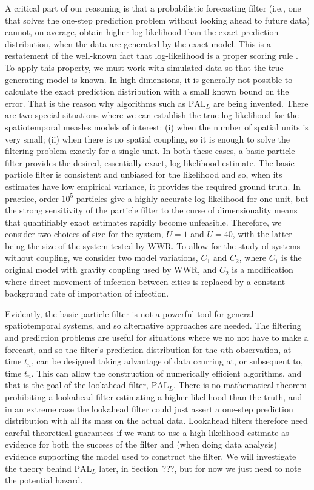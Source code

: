 \documentclass{article}
\newcommand\PALL{$\mathrm{PAL}_L$} %
\begin{document}
A critical part of our reasoning is that a probabilistic forecasting filter (i.e., one that solves the one-step prediction problem without looking ahead to future data) cannot, on average, obtain higher log-likelihood than the exact prediction distribution, when the data are generated by the exact model.
This is a restatement of the well-known fact that log-likelihood is a proper scoring rule \citep{gneiting07}.
To apply this property, we must work with simulated data so that the true generating model is known.
In high dimensions, it is generally not possible to calculate the exact prediction distribution with a small known bound on the error. 
That is the reason why algorithms such as {\PALL} are being invented. 
There are two special situations where we can establish the true log-likelihood for the spatiotemporal measles models of interest: (i) when the number of spatial units is very small; (ii) when there is no spatial coupling, so it is enough to solve the filtering problem exactly for a single unit.
In both these cases, a basic particle filter provides the desired, essentially exact, log-likelihood estimate. 
The basic particle filter is consistent and unbiased for the likelihood \citep{delmoral04} and so, when its estimates have low empirical variance, it provides the required ground truth.
In practice, order $10^5$ particles give a highly accurate log-likelihood for one unit, but the strong sensitivity of the particle filter to the curse of dimensionality \citep{bengtsson??} means that quantifiably exact estimates rapidly become unfeasible.
Therefore, we consider two choices of size for the system, $U=1$ and $U=40$, with the latter being the size of the system tested by WWR.
To allow for the study of systems without coupling, we consider two model variations, $C_1$ and $C_2$, where $C_1$ is the original model with gravity coupling used by WWR, and $C_2$ is a modification where direct movement of infection between cities is replaced by a constant background rate of importation of infection.

Evidently, the basic particle filter is not a powerful tool for general spatiotemporal systems, and so alternative approaches are needed.
The filtering and prediction problems are useful for situations where we no not have to make a forecast, and so the filter's prediction distribution for the $n$th observation, at time $t_n$, can be designed taking advantage of data ccurring at, or subsequent to, time $t_n$.
This can allow the construction of numerically efficient algorithms, and that is the goal of the lookahead filter, \PALL.
There is no mathematical theorem prohibiting a lookahead filter estimating a higher likelihood than the truth, and in an extreme case the lookahead filter could just assert a one-step prediction distribution with all its mass on the actual data. 
Lookahead filters therefore need careful theoretical guarantees if we want to use a high likelihood estimate as evidence for both the success of the filter and (when doing data analysis) evidence supporting the model used to construct the filter.
We will investigate the theory behind {\PALL} later, in Section~???, but for now we just need to note the potential hazard.
\end{document}
